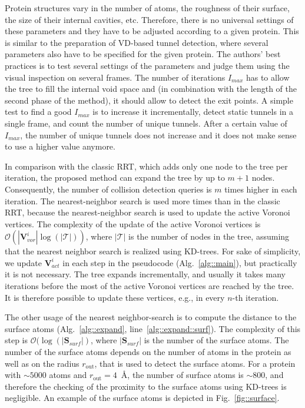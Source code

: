 \documentclass[usletter, 10pt, conference]{svjour3}      %
\def\T{\mathcal{T}}
\def\Imax{I_{max}} %
\def\VV{\mathbf{V}_{vor}}
\def\VVA{\mathbf{V}_{act}}
\def\gprobe{r_{\mathrm{out}}}
\def\SSA{\mathbf{S}_{surf}}
\begin{document}
Protein structures vary in the number of atoms, the roughness of their surface, the size of their internal cavities, etc. 
Therefore, there is no universal settings of these parameters and they have to be adjusted according to a given protein.
This is similar to the preparation of VD-based tunnel detection, where several parameters also have to be specified for the given protein.
The authors' best practices is to test several settings of the parameters and judge them using the visual inspection on several frames.
The number of iterations $\Imax$ has to allow the tree to fill the internal void space and (in combination with the length of the second phase of the method), it should allow to detect the exit points.
A simple test to find a good $\Imax$ is to increase it incrementally, detect static tunnels in a single frame, and count the number of unique tunnels.
After a certain value of $\Imax$, the number of unique tunnels does not increase and it does not make sense to use a higher value anymore.


In comparison with the classic RRT, which adds only one node to the tree per iteration, the proposed method can expand the tree by up to $m+1$ nodes.
Consequently, the number of collision detection queries is $m$ times higher in each iteration.
The nearest-neighbor search is used more times than in the classic RRT, because the nearest-neighbor search is used to update the active Voronoi vertices.
The complexity of the update of the active Voronoi vertices is $\mathcal{O}(|\VV^i|\log(|\T|))$, where $|\T|$ is the number of nodes in the tree, assuming that the nearest neighbor search is realized using KD-trees.
For sake of simplicity, we update $\VVA^i$ in each step in the pseudocode (Alg.~\ref{alg::main}), but practically it is not necessary.
The tree expands incrementally, and usually it takes many iterations before the most of the active Voronoi vertices are reached by the tree.
It is therefore possible to update these vertices, e.g., in every $n$-th iteration. 

The other usage of the nearest neighbor-search is to compute the distance to the surface atoms (Alg.~\ref{alg::expand}, line~\ref{alg::expand::surf}).
The complexity of this step is $\mathcal{O}(\log( |\SSA|)$, where $|\SSA|$ is the number of the surface atoms.
The number of the surface atoms depends on the number of atoms in the protein as well as on the radius $\gprobe$, that is used to detect the surface atoms.
For a protein with $\sim 5000$ atoms and $\gprobe=4$~\AA, the number of surface atoms is $\sim800$, and therefore the checking of the proximity to the surface atoms using KD-trees is negligible. 
An example of the surface atoms is depicted in Fig.~\ref{fig::surface}.
\end{document}
